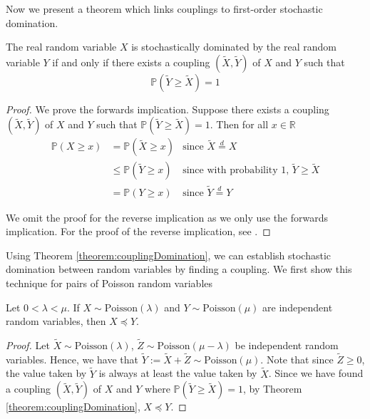
Now we present a theorem which links couplings to first-order stochastic domination.

\begin{theorem}\label{theorem:couplingDomination}
	The real random variable $X$ is stochastically dominated by the real random variable $Y$ if and only if there exists a coupling $(\tilde{X}, \tilde{Y})$ of $X$ and $Y$ such that
	$$
		\mathbb{P}(\tilde{Y} \geq \tilde{X}) = 1
	$$
\end{theorem}

\begin{proof}
	We prove the forwards implication. Suppose there exists a coupling $(\tilde{X}, \tilde{Y})$ of $X$ and $Y$ such that $\mathbb{P}(\tilde{Y} \geq \tilde{X}) = 1$. Then for all $x \in \mathbb{R}$
	\begin{align*}
		\mathbb{P}(X \geq x) &= \mathbb{P}(\tilde{X} \geq x) & \text{since } \tilde{X} \stackrel{d}{=} X \\
		&\leq \mathbb{P}(\tilde{Y} \geq x) & \text{since with probability 1, } \tilde{Y} \geq \tilde{X} \\
		&= \mathbb{P}(Y \geq x) & \text{since } \tilde{Y} \stackrel{d}{=} Y 
	\end{align*}

	We omit the proof for the reverse implication as we only use the forwards implication. For the proof of the reverse implication, see \cite{coupling}.
\end{proof}


Using Theorem \ref{theorem:couplingDomination}, we can establish stochastic domination between random variables by finding a coupling. We first show this technique	for pairs of Poisson random variables

\begin{theorem}
	Let $0 < \lambda < \mu$. If $X \sim \text{Poisson}(\lambda)$ and $Y \sim \text{Poisson}(\mu)$ are independent random variables, then $X \preceq Y$. 
\end{theorem}

\begin{proof}
	Let $\tilde{X} \sim \text{Poisson}(\lambda)$, $\tilde{Z} \sim \text{Poisson}(\mu - \lambda)$ be independent random variables. Hence, we have that $\tilde{Y} := \tilde{X} + \tilde{Z} \sim \text{Poisson}(\mu)$. Note that since $\tilde{Z} \geq 0$, the value taken by $\tilde{Y}$ is always at least the value taken by $\tilde{X}$. Since we have found a coupling $(\tilde{X}, \tilde{Y})$ of $X$ and $Y$ where $\mathbb{P}(\tilde{Y} \geq \tilde{X}) = 1$, by Theorem \ref{theorem:couplingDomination}, $X \preceq Y$.
\end{proof}

